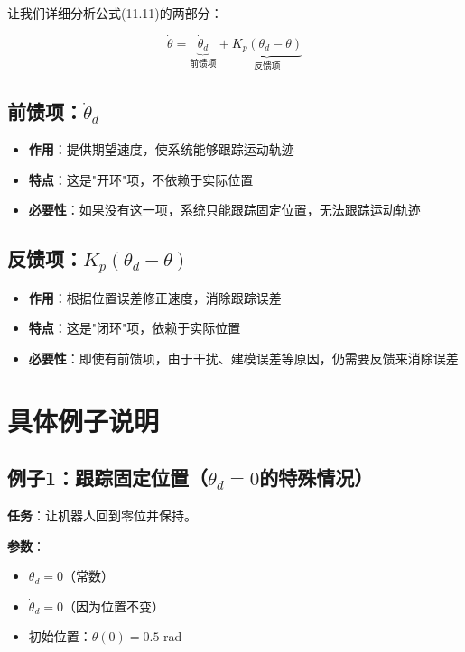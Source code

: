 \documentclass[12pt,a4paper]{article}
\begin{document}
让我们详细分析公式(11.11)的两部分：

\begin{equation}
\dot{\theta} = \underbrace{\dot{\theta}_d}_{\text{前馈项}} + \underbrace{K_p(\theta_d - \theta)}_{\text{反馈项}}
\end{equation}

\subsection{前馈项：$\dot{\theta}_d$}

\begin{itemize}
\item \textbf{作用}：提供期望速度，使系统能够跟踪运动轨迹
\item \textbf{特点}：这是"开环"项，不依赖于实际位置
\item \textbf{必要性}：如果没有这一项，系统只能跟踪固定位置，无法跟踪运动轨迹
\end{itemize}

\subsection{反馈项：$K_p(\theta_d - \theta)$}

\begin{itemize}
\item \textbf{作用}：根据位置误差修正速度，消除跟踪误差
\item \textbf{特点}：这是"闭环"项，依赖于实际位置
\item \textbf{必要性}：即使有前馈项，由于干扰、建模误差等原因，仍需要反馈来消除误差
\end{itemize}

\section{具体例子说明}

\subsection{例子1：跟踪固定位置（$\theta_d = 0$的特殊情况）}

\textbf{任务}：让机器人回到零位并保持。

\textbf{参数}：
\begin{itemize}
\item $\theta_d = 0$（常数）
\item $\dot{\theta}_d = 0$（因为位置不变）
\item 初始位置：$\theta(0) = 0.5$ rad
\end{itemize}
\end{document}
